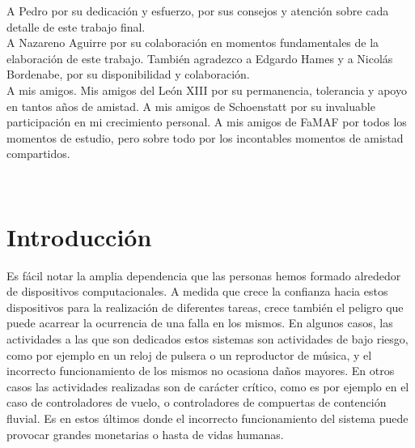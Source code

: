 \documentclass[pdftex,a4paper,12pt]{book}
\begin{document}
A Pedro por su dedicaci\'on y esfuerzo, por sus consejos y atenci\'on sobre cada detalle de este trabajo final.\\

A Nazareno Aguirre por su colaboraci\'on en momentos fundamentales de la elaboraci\'on de este trabajo. Tambi\'en agradezco a Edgardo Hames y a Nicol\'as Bordenabe, por su disponibilidad y colaboraci\'on.\\

A mis amigos. Mis amigos del Le\'on XIII por su permanencia, tolerancia y apoyo en tantos a\~nos de amistad. A mis amigos de Schoenstatt por su invaluable participaci\'on en mi crecimiento personal. A mis amigos de FaMAF por todos los momentos de estudio, pero sobre todo por los incontables momentos de amistad compartidos.







\newpage
~\\
\newpage
\tableofcontents




\newpage


\chapter{Introducci\'on}
\label{introduccion}

Es f\'acil notar la amplia dependencia que las personas hemos formado alrededor de dispositivos computacionales. A medida que crece la confianza hacia estos dispositivos para la realizaci\'on de diferentes tareas, crece tambi\'en el peligro que puede acarrear la ocurrencia de una falla en los mismos. En algunos casos, las actividades a las que son dedicados estos sistemas son actividades de bajo riesgo, como por ejemplo en un reloj de pulsera o un reproductor de m\'usica, y el incorrecto funcionamiento de los mismos no ocasiona da\~nos mayores. En otros casos las actividades realizadas son de car\'acter cr\'itico, como es por ejemplo en el caso de controladores de vuelo, o controladores de compuertas de contenci\'on fluvial. Es en estos \'ultimos donde el incorrecto funcionamiento del sistema puede provocar grandes monetarias o hasta de vidas humanas.
\end{document}
